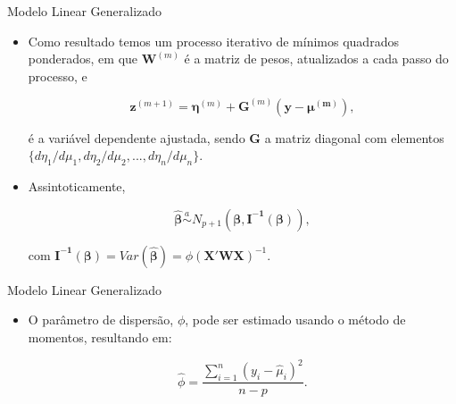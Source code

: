 \documentclass[10pt, aspectratio=169]{beamer}
\begin{document}


\begin{frame}{Modelo Linear Generalizado} 

\begin{itemize}

\item Como resultado temos um processo iterativo de mínimos quadrados ponderados, em que $\boldsymbol{W}^{(m)}$ é a matriz de pesos, atualizados a cada passo do processo, e

$$
    \boldsymbol{z}^{(m+1)}=\boldsymbol{\eta}^{(m)}+\boldsymbol{G}^{(m)}\boldsymbol{(y-\mu^{(m)})},
$$

é a variável dependente ajustada, sendo $\boldsymbol{G}$ a matriz diagonal com elementos $\{d\eta_{1}/d\mu_{1},
d\eta_{2}/d\mu_{2},...,d\eta_{n}/d\mu_{n}\}.$

\item Assintoticamente,

$$
    \boldsymbol{\hat{\beta}}\overset{a}{\sim} N_{p+1}\left ( \boldsymbol{\beta}, \boldsymbol{I^{-1}\left ( \boldsymbol{\beta} \right )} \right ),
$$

com $\boldsymbol{I^{-1}(\boldsymbol{\beta})}=Var(\boldsymbol{\hat{\beta}})=\phi (\boldsymbol{X'WX})^{-1}$. 


\end{itemize}

\end{frame}





\begin{frame}{Modelo Linear Generalizado} 

\begin{itemize}


\item O parâmetro de dispersão, $\phi$, pode ser estimado usando o método de momentos, resultando em:

\vspace{0.5cm}

$$ \hat{\phi}=\frac{\sum_{i=1}^{n} (y_{i}-\hat{\mu}_{i})^{2}}{n-p}. $$

\end{itemize}

\end{frame}
\end{document}
